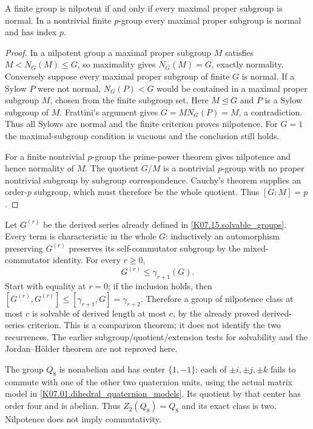 \begin{theorem}\label{thm:maximal-normal-nilpotent}
A finite group is nilpotent if and only if every maximal proper subgroup
is normal. In a nontrivial finite $p$-group every maximal proper
subgroup is normal and has index $p$.
\end{theorem}
\begin{proof}
In a nilpotent group a maximal proper subgroup $M$ satisfies
$M<N_G(M)\leq G$, so maximality gives $N_G(M)=G$, exactly
normality. Conversely suppose every maximal proper subgroup of finite
$G$ is normal. If a Sylow $P$ were not normal, $N_G(P)<G$ would
be contained in a maximal proper subgroup $M$, chosen from the finite
subgroup set. Here $M\trianglelefteq G$ and $P$ is a Sylow
subgroup of $M$. Frattini's argument gives
$G=M N_G(P)=M$, a contradiction. Thus all Sylows are normal and
the finite criterion proves nilpotence. For $G=1$ the maximal-subgroup
condition is vacuous and the conclusion still holds.

For a finite nontrivial $p$-group the prime-power theorem gives
nilpotence and hence normality of $M$. The quotient $G/M$ is a
nontrivial $p$-group with no proper nontrivial subgroup by subgroup
correspondence. Cauchy's theorem supplies an order-$p$ subgroup, which
must therefore be the whole quotient. Thus $[G:M]=p$.
\end{proof}

Let $G^{(r)}$ be the derived series already defined in
\ref{K07.15.solvable_groups}. Every term is characteristic in the whole
$G$: inductively an automorphism preserving $G^{(r)}$ preserves its
self-commutator subgroup by the mixed-commutator identity. For every
$r\geq0$,
\[
 G^{(r)}\leq\gamma_{r+1}(G).
\]
Start with equality at $r=0$; if the inclusion holds, then
$[G^{(r)},G^{(r)}]\leq[\gamma_{r+1},G]=\gamma_{r+2}$.
Therefore a group of nilpotence class at most $c$ is solvable of derived
length at most $c$, by the already proved derived-series criterion.
This is a comparison theorem; it does not identify the two recurrences.
The earlier subgroup/quotient/extension tests for solvability and the
Jordan--H\"older theorem are not reproved here.

The group $Q_8$ is nonabelian and has center $\{1,-1\}$: each of
$\pm i,\pm j,\pm k$ fails to commute with one of the other two
quaternion units, using the actual matrix model in
\ref{K07.01.dihedral_quaternion_models}. Its quotient by that center
has order four and is abelian. Thus $Z_2(Q_8)=Q_8$ and its exact
class is two. Nilpotence does not imply commutativity.

